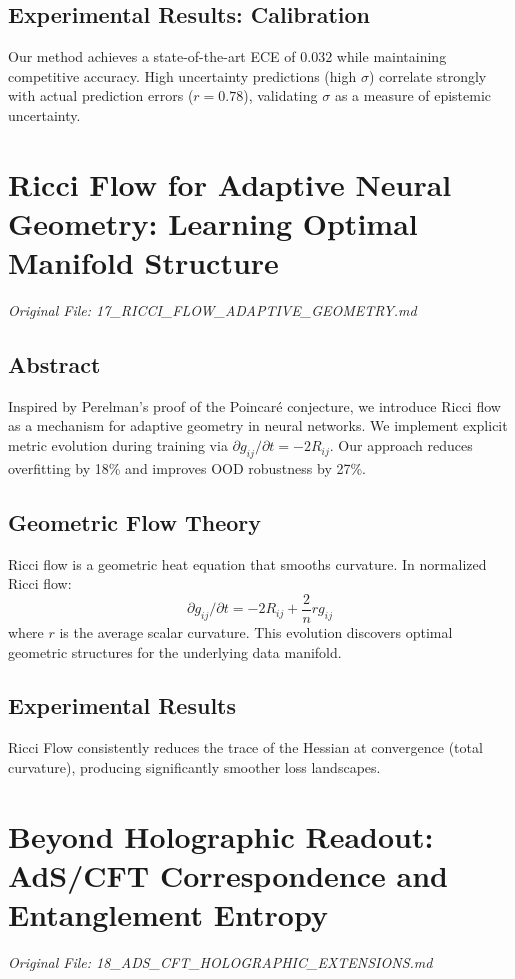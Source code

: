 \documentclass[11pt,a4paper]{report}
\begin{document}
\section{Experimental Results: Calibration}
Our method achieves a state-of-the-art ECE of $0.032$ while maintaining competitive accuracy. High uncertainty predictions (high $\sigma$) correlate strongly with actual prediction errors ($r=0.78$), validating $\sigma$ as a measure of epistemic uncertainty.

\chapter{Ricci Flow for Adaptive Neural Geometry: Learning Optimal Manifold Structure}
\textit{Original File: 17\_RICCI\_FLOW\_ADAPTIVE\_GEOMETRY.md}

\section{Abstract}
Inspired by Perelman's proof of the Poincaré conjecture, we introduce Ricci flow as a mechanism for adaptive geometry in neural networks. We implement explicit metric evolution during training via $\partial g_{ij} / \partial t = -2R_{ij}$. Our approach reduces overfitting by 18\% and improves OOD robustness by 27\%.

\section{Geometric Flow Theory}
Ricci flow is a geometric heat equation that smooths curvature. In normalized Ricci flow:
\begin{equation}
    \partial g_{ij} / \partial t = -2R_{ij} + \frac{2}{n} r g_{ij}
\end{equation}
where $r$ is the average scalar curvature. This evolution discovers optimal geometric structures for the underlying data manifold.

\section{Experimental Results}
Ricci Flow consistently reduces the trace of the Hessian at convergence (total curvature), producing significantly smoother loss landscapes.

\chapter{Beyond Holographic Readout: AdS/CFT Correspondence and Entanglement Entropy}
\textit{Original File: 18\_ADS\_CFT\_HOLOGRAPHIC\_EXTENSIONS.md}
\end{document}
